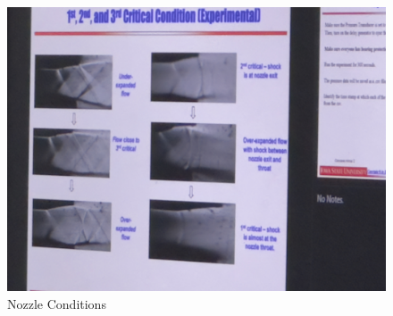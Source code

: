 \begin{figure}[htpb]
    \centering
    \includegraphics[width=0.75\linewidth]{Figures/six_conditions.jpeg}
    \caption[Nozzle Conditions]{Nozzle Conditions}
    \label{fig: NozzleConditions}
\end{figure}
